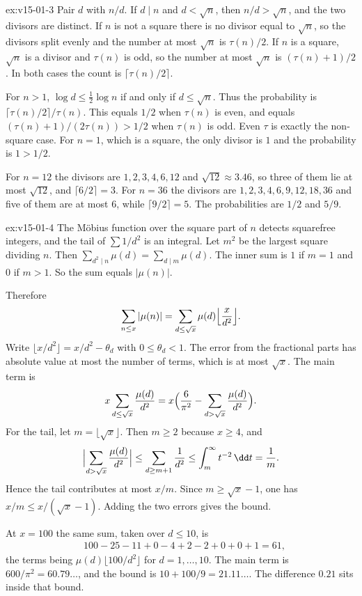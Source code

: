 \begin{solution}{ex:v15-01-3}
\idea Pair \(d\) with \(n/d\).
\writeup If \(d\mid n\) and \(d<\sqrt n\), then \(n/d>\sqrt n\), and the two divisors are distinct. If \(n\) is not a square there is no divisor equal to \(\sqrt n\), so the divisors split evenly and the number at most \(\sqrt n\) is \(\tau(n)/2\). If \(n\) is a square, \(\sqrt n\) is a divisor and \(\tau(n)\) is odd, so the number at most \(\sqrt n\) is \((\tau(n)+1)/2\). In both cases the count is \(\lceil\tau(n)/2\rceil\).

For \(n>1\), \(\log d\le\tfrac12\log n\) if and only if \(d\le\sqrt n\). Thus the probability is \(\lceil\tau(n)/2\rceil/\tau(n)\). This equals \(1/2\) when \(\tau(n)\) is even, and equals \((\tau(n)+1)/(2\tau(n))>1/2\) when \(\tau(n)\) is odd. Even \(\tau\) is exactly the non-square case. For \(n=1\), which is a square, the only divisor is \(1\) and the probability is \(1>1/2\).

For \(n=12\) the divisors are \(1,2,3,4,6,12\) and \(\sqrt{12}\approx3.46\), so three of them lie at most \(\sqrt{12}\), and \(\lceil6/2\rceil=3\). For \(n=36\) the divisors are \(1,2,3,4,6,9,12,18,36\) and five of them are at most \(6\), while \(\lceil9/2\rceil=5\). The probabilities are \(1/2\) and \(5/9\).
\end{solution}

\begin{solution}{ex:v15-01-4}
\idea The Möbius function over the square part of \(n\) detects squarefree integers, and the tail of \(\sum 1/d^2\) is an integral.
\writeup Let \(m^2\) be the largest square dividing \(n\). Then \(\sum_{d^2\mid n}\mu(d)=\sum_{d\mid m}\mu(d)\). The inner sum is \(1\) if \(m=1\) and \(0\) if \(m>1\). So the sum equals \(|\mu(n)|\).

Therefore
\[
\sum_{n\le x}|\mu(n)|=\sum_{d\le\sqrt x}\mu(d)\Bigl\lfloor\frac x{d^2}\Bigr\rfloor.
\]
Write \(\lfloor x/d^2\rfloor=x/d^2-\theta_d\) with \(0\le\theta_d<1\). The error from the fractional parts has absolute value at most the number of terms, which is at most \(\sqrt x\). The main term is
\[
x\sum_{d\le\sqrt x}\frac{\mu(d)}{d^2}=x\Bigl(\frac6{\pi^2}-\sum_{d>\sqrt x}\frac{\mu(d)}{d^2}\Bigr).
\]
For the tail, let \(m=\lfloor\sqrt x\rfloor\). Then \(m\ge2\) because \(x\ge4\), and
\[
\Bigl|\sum_{d>\sqrt x}\frac{\mu(d)}{d^2}\Bigr|\le\sum_{d\ge m+1}\frac1{d^2}\le\int_m^\infty t^{-2}\,\dd t=\frac1m.
\]
Hence the tail contributes at most \(x/m\). Since \(m\ge\sqrt x-1\), one has \(x/m\le x/(\sqrt x-1)\). Adding the two errors gives the bound.

At \(x=100\) the same sum, taken over \(d\le10\), is
\begin{align*}
&100-25-11+0-4+2-2+0+0+1=61,
\end{align*}
the terms being \(\mu(d)\lfloor100/d^2\rfloor\) for \(d=1,\dots,10\). The main term is \(600/\pi^2=60.79\ldots\), and the bound is \(10+100/9=21.11\ldots\). The difference \(0.21\) sits inside that bound.
\end{solution}

